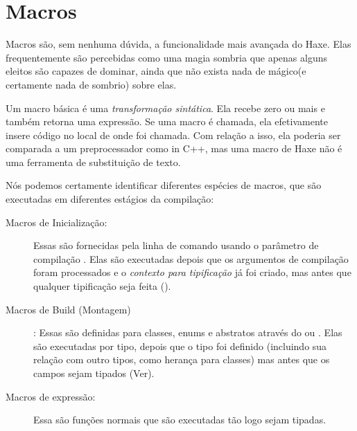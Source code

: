 \chapter{Macros}
\label{macro}

Macros são, sem nenhuma dúvida, a funcionalidade mais avançada do Haxe. Elas frequentemente são percebidas como uma magia sombria que apenas alguns eleitos são capazes de dominar, ainda que não exista nada de mágico(e certamente nada de sombrio) sobre elas.




Um macro básica é uma \emph{transformação sintática}. Ela recebe zero ou mais  e também retorna uma expressão. Se uma macro é chamada, ela efetivamente insere código no local de onde foi chamada. Com relação a isso, ela poderia ser comparada a um preprocessador como  in C++, mas uma macro de Haxe não é uma ferramenta de substituição de texto.

Nós podemos certamente identificar diferentes espécies de macros, que são executadas em diferentes estágios da compilação:

\begin{description}
    \item[Macros de Inicialização:] Essas são fornecidas pela linha de comando usando o parâmetro de compilação . Elas são executadas depois que os argumentos de compilação foram processados e o \emph{contexto para tipificação} já foi criado, mas antes que qualquer tipificação seja feita ().
    \item[Macros de Build (Montagem)]: Essas são definidas para classes, enums e abstratos através do ou . Elas são executadas por tipo, depois que o tipo foi definido (incluindo sua relação com outro tipos, como herança para classes) mas antes que os campos sejam tipados (Ver).
    \item[Macros de expressão:] Essa são funções normais que são executadas tão logo sejam tipadas.
\end{description}


